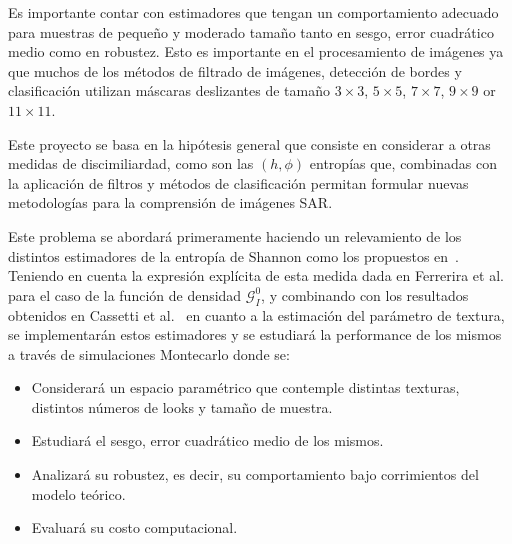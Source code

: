 \documentclass[11pt]{article}
\begin{document}

Es importante contar con estimadores que tengan un comportamiento adecuado para muestras de pequeño y moderado tamaño tanto en sesgo, error cuadrático medio como en robustez. Esto es importante en el procesamiento de imágenes ya que muchos de los métodos de filtrado de imágenes, detección de bordes y clasificación utilizan máscaras deslizantes de tamaño $3 \times 3$,  $5 \times 5$, $7 \times 7$, $9 \times 9$ or  $11 \times 11$. 

Este proyecto se basa en la hipótesis general que consiste en considerar a otras medidas de discimiliardad, como son las $(h,\phi)$ entropías que, combinadas con la aplicación de filtros y métodos de clasificación permitan formular nuevas metodologías para la comprensión de imágenes SAR.

Este problema se abordará primeramente haciendo un relevamiento de los distintos estimadores de la entropía de Shannon como los propuestos en~\cite{Beirlant1997,AlOmari2013,Behmardi2011}. Teniendo en cuenta la expresión explícita de esta medida dada en Ferrerira et al.~\cite{Ferreira2020} para el caso de la función de densidad $\mathcal{G}_I^0$, y combinando con los resultados obtenidos en Cassetti et al.~\cite{Cassetti2020} en cuanto a la estimación del parámetro de textura, se implementarán estos estimadores y se estudiará la performance de los mismos a través de simulaciones Montecarlo donde se:
\begin{itemize}
	\item Considerará un espacio paramétrico que contemple distintas texturas, distintos números de looks y tamaño de muestra.
	\item Estudiará el sesgo, error cuadrático medio de los mismos.
	\item Analizará su robustez, es decir, su comportamiento bajo corrimientos del modelo teórico. 
	\item Evaluará su costo computacional.
\end{itemize} 
\end{document}
